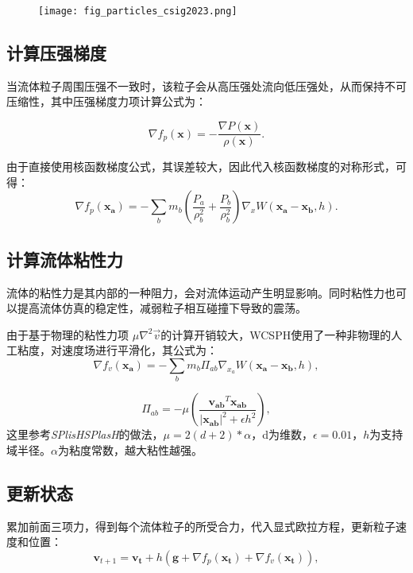 \begin{figure}[H]
	\centering
	\texttt{[image: fig\_particles\_csig2023.png]}
\end{figure}

\subsection{计算压强梯度}
当流体粒子周围压强不一致时，该粒子会从高压强处流向低压强处，从而保持不可压缩性，其中压强梯度力项计算公式为：

\begin{equation}
	\nabla f_p(\boldsymbol{x}) =-\frac{\nabla P(\boldsymbol{x})}{\rho(\boldsymbol{x})}.
\end{equation}

由于直接使用核函数梯度公式，其误差较大，因此代入核函数梯度的对称形式，可得：
\begin{equation}
	\nabla f_p(\boldsymbol{x_a}) = -\sum_b m_b(\frac{P_a}{\rho_b^2}+\frac{P_b}{\rho_b^2})\nabla_{x} W(\boldsymbol{x_a}-\boldsymbol{x_b},h).
\end{equation}
\subsection{计算流体粘性力}
流体的粘性力是其内部的一种阻力，会对流体运动产生明显影响。同时粘性力也可以提高流体仿真的稳定性，减弱粒子相互碰撞下导致的震荡。

由于基于物理的粘性力项 $\mu\nabla^2\vec{v}$的计算开销较大，WCSPH使用了一种非物理的人工粘度，对速度场进行平滑化，其公式为：
\begin{equation}
	\nabla f_v(\boldsymbol{x_a})=-\sum_bm_b\Pi_{ab}\nabla_{x_a} W(\boldsymbol{x_a}-\boldsymbol{x_b},h),
\end{equation}

\begin{equation}
	\Pi_{ab}=-\mu(\frac{\boldsymbol{v_{ab}}^T\boldsymbol{x_{ab}}}{|\boldsymbol{x_{ab}}|^2+\epsilon h^2}),
\end{equation}
这里参考\textit{SPlisHSPlasH}的做法，$\mu=2(d+2)*\alpha$，d为维数，$\epsilon=0.01$，$h$为支持域半径。$\alpha$为粘度常数，越大粘性越强。
\subsection{更新状态}
累加前面三项力，得到每个流体粒子的所受合力，代入显式欧拉方程，更新粒子速度和位置：
\begin{equation}
	\boldsymbol{v}_{t+1}=\boldsymbol{v_{t}}+h(\boldsymbol{g}+\nabla f_p(\boldsymbol{x_t})+\nabla f_v(\boldsymbol{x_t})),
\end{equation}

